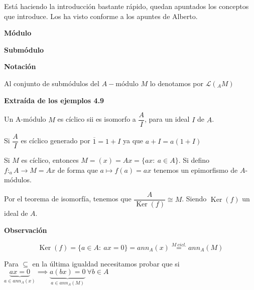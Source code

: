 \documentclass[openany]{book}
\begin{document}
Está haciendo la introducción bastante rápido, quedan apuntados los conceptos que introduce. Los ha visto conforme a los apuntes de Alberto.

\begin{definition}\textbf{Módulo}

    
    
\end{definition}

\begin{definition}
    \textbf{Submódulo}
\end{definition}

\begin{flushright}
    \textbf{Notación}
\end{flushright}

Al conjunto de submódulos del $ A- $módulo $ M $ lo denotamos por $ \mathcal{L}(_{A}M) $

\begin{proposition}
    \textbf{Extraída de los ejemplos 4.9}

    Un A-módulo $ M$ es cíclico sii es isomorfo a $ \dfrac{A}{I}$, para un ideal $ I$ de $ A$.

\end{proposition}

\begin{demonstration}

    Si $ \dfrac{A}{I}$ es cíclico generado por $ \overline{1}=1+I$ ya que $ a+I = a(1+I)$ 

    Si $ M$ es cíclico, entonces $ M =(x) = Ax = \{ax:\ a \in A\}$. Si defino $ f:_{a}A\to M= Ax$ de forma que $ a\mapsto f(a) = ax$ tenemos un epimorfismo de $ A$-módulos.

    Por el teorema de isomorfía, tenemos que $ \dfrac{A}{\operatorname{Ker}(f)}\cong M$. Siendo $ \operatorname{Ker}(f)$ un ideal de $ A$.

    \begin{flushright}
        \textbf{Observación}
    \end{flushright}
    
    $$ \operatorname{Ker}(f) = \{a \in A:\ ax = 0\} = an n_{A}(x) \stackrel{M\ cicl.}{=} an n_{A}(M) $$ 

    Para $ \subseteq $ en la última igualdad necesitamos probar que si $ \underbrace{ax = 0}_{a \in an n_{A}(x)} \implies \underbrace{a(bx)=0}_{a \in an n_{A}(M)}\ \forall b \in A$
\end{demonstration}
\setcounter{propositiont}{9}
\end{document}
